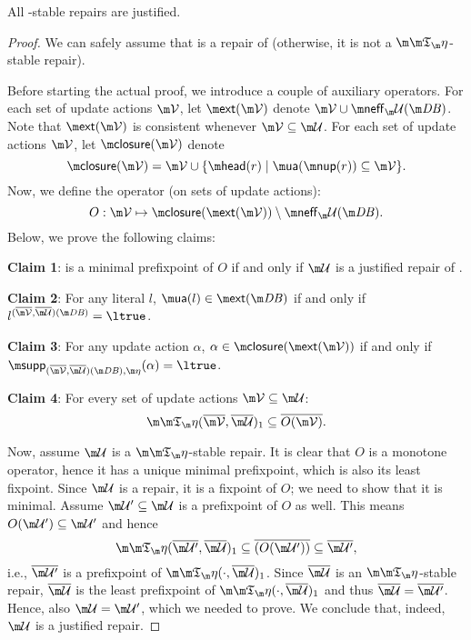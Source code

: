 \begin{proposition}\label{prop:stable_is_justified}
All \Ap-stable repairs are justified. 
\end{proposition}
\begin{proof}
We can safely assume that \UU is a repair of \db (otherwise, it is not a $\Ap$-stable repair).

 Before starting the actual proof, we introduce a couple of auxiliary operators. 
 For each set of update actions $\VV$, let $\ext(\VV)$ denote $\VV\cup \neff_\UU(\db)$.
 Note that $\ext(\VV)$ is consistent whenever $\VV\subseteq\UU$.
 For each set of update actions $\VV$, let $\closure(\VV)$ denote \[\closure(\VV)= \VV\cup \{\head(r) \mid \actof(\nup(r)) \subseteq \VV\}.\] 
 Now, we define the operator (on sets of update actions):
\[O: \VV \mapsto \closure(\ext(\VV)) \setminus \neff_\UU(\db).\]
Below, we prove the following claims:
\begin{compactdesc}
 \item \textbf{Claim 1}: \UU is a minimal prefixpoint of $O$ if and only if $\UU$ is a justified repair of \fulldb. 
 \item \textbf{Claim 2}: For any literal $l$, $\actof(l)\in \ext(\db)$ if and only if $l^{(\overline \VV, \overline \UU)(\db)} = \ltrue$. 
 \item \textbf{Claim 3}: For any update action $\alpha$, $\alpha\in \closure(\ext(\VV))$ if and only if  $\supp_{(\overline\VV,\overline\UU)(\db),\aics}(\alpha) = \ltrue$. 
 \item \textbf{Claim 4}: For every set of update actions $\VV\subseteq \UU$: 
 \[\Ap(\overline\VV,\overline\UU)_1\subseteq \overline{O(\VV)}.\] 
\end{compactdesc}
Now, assume $\UU$ is a $\Ap$-stable repair. It is clear that $O$ is a monotone operator, hence it has a unique minimal prefixpoint, which is also its least fixpoint. Since $\UU$ is a repair, it is a fixpoint of $O$; we need to show that it is minimal. Assume $\UU'\subseteq \UU$ is a prefixpoint of $O$ as well. This means $O(\UU')\subseteq \UU'$ 
and hence 
\[\Ap(\overline{\UU'},\overline\UU)_1 \subseteq \overline{(O(\UU'))}\subseteq \overline{\UU'},\]
i.e., $\overline{\UU'}$ is a prefixpoint of $\Ap(\cdot,\overline\UU)_1$. 
Since $\overline\UU$ is an $\Ap$-stable repair, $\overline\UU$ is the least prefixpoint of $\Ap(\cdot,\overline\UU)_1$ and thus $\overline\UU = \overline{\UU'}$. Hence, also $\UU=\UU'$, which we needed to prove. We conclude that, indeed, $\UU$ is a justified repair. 



\end{proof}

